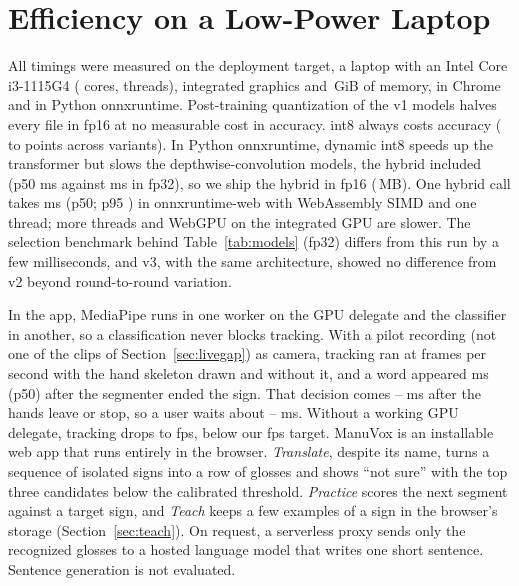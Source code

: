 \section{Efficiency on a Low-Power Laptop}
\label{sec:efficiency}

All timings were measured on the deployment target, a laptop with an Intel Core i3-1115G4
( cores,  threads), integrated graphics and \,GiB of memory,
in Chrome  and in Python onnxruntime. Post-training quantization of the v1 models
\cite{jacob2018quantization,nagel2021whitepaper} halves every file in fp16 at no measurable cost
in accuracy. int8 always costs accuracy ( to  points across
variants). In Python onnxruntime, dynamic int8 speeds up the transformer but slows the
depthwise-convolution models, the hybrid included (p50  ms against
 ms in fp32), so we ship the hybrid in fp16 (\,MB). One
hybrid call takes  ms (p50; p95 ) in onnxruntime-web with
WebAssembly SIMD and one thread; more threads and WebGPU on the integrated GPU are slower. The
selection benchmark behind Table~\ref{tab:models} (fp32) differs from this run by a few
milliseconds, and v3, with the same architecture, showed no difference from v2 beyond
round-to-round variation.

In the app, MediaPipe runs in one worker on the GPU delegate and the classifier in another, so a
classification never blocks tracking. With a pilot recording (not one of the clips of
Section~\ref{sec:livegap}) as camera, tracking ran at  frames per second with the
hand skeleton drawn and  without it, and a word appeared  ms (p50)
after the segmenter ended the sign. That decision comes -- ms after
the hands leave or stop, so a user waits about -- ms. Without a working GPU
delegate, tracking drops to  fps, below our  fps target.
\ifwithsystem
ManuVox is an installable web app that runs entirely in the browser. \emph{Translate}, despite
its name, turns a sequence of isolated signs into a row of glosses and shows ``not sure'' with the
top three candidates below the calibrated threshold. \emph{Practice} scores the next segment
against a target sign, and \emph{Teach} keeps a few examples of a sign in the browser's storage
(Section~\ref{sec:teach}). On request, a serverless proxy sends only the recognized glosses to a
hosted language model that writes one short sentence. Sentence generation is not evaluated.
\fi
